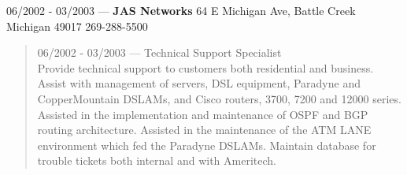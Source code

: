 06/2002 - 03/2003 --- {\bf JAS Networks} 64 E Michigan Ave, Battle Creek Michigan 49017 269-288-5500
\begin{quote}
06/2002 - 03/2003 --- Technical Support Specialist\\
Provide technical support to customers both residential and business. Assist with management of servers, DSL equipment, Paradyne and CopperMountain DSLAMs, and Cisco routers, 3700, 7200 and 12000 series. Assisted in the implementation and maintenance of OSPF and BGP routing architecture. Assisted in the maintenance of the ATM LANE environment which fed the Paradyne DSLAMs. Maintain database for trouble tickets both internal and with Ameritech.
\end{quote}

